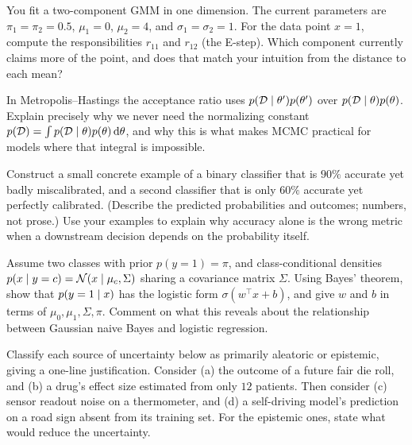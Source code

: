 \begin{exercise}
You fit a two-component GMM in one dimension. The current parameters are
$\pi_1=\pi_2=0.5$, $\mu_1=0$, $\mu_2=4$, and $\sigma_1=\sigma_2=1$. For the data
point $x=1$, compute the responsibilities $r_{11}$ and $r_{12}$ (the E-step).
Which component currently claims more of the point, and does that match your
intuition from the distance to each mean?
\end{exercise}

\begin{exercise}
In Metropolis--Hastings the acceptance ratio uses
$p(\mathcal{D}\mid\theta')p(\theta')$ over
$p(\mathcal{D}\mid\theta)p(\theta)$. Explain precisely why we never need the
normalizing constant
$p(\mathcal{D}) = \int p(\mathcal{D}\mid\theta)p(\theta)\,\mathrm{d}\theta$,
and why this is what makes MCMC practical for models where that integral is
impossible.
\end{exercise}

\begin{exercise}
Construct a small concrete example of a binary classifier that is $90\%$ accurate
yet badly miscalibrated, and a second classifier that is only $60\%$ accurate yet
perfectly calibrated. (Describe the predicted probabilities and outcomes; numbers,
not prose.) Use your examples to explain why accuracy alone is the wrong metric
when a downstream decision depends on the probability itself.
\end{exercise}

\begin{exercise}
Assume two classes with prior $p(y=1)=\pi$, and class-conditional densities
$p(x\mid y=c) = \mathcal{N}(x\mid\mu_c,\Sigma)$ sharing a covariance matrix $\Sigma$.
Using Bayes' theorem, show that $p(y=1\mid x)$ has
the logistic form $\sigma(w^\top x + b)$, and give $w$ and $b$ in terms of
$\mu_0,\mu_1,\Sigma,\pi$. Comment on what this reveals about the relationship
between Gaussian naive Bayes and logistic regression.
\end{exercise}

\begin{exercise}
Classify each source of uncertainty below as primarily aleatoric or epistemic,
giving a one-line justification. Consider (a) the outcome of a future fair die
roll, and (b) a drug's effect size estimated from only $12$ patients. Then
consider (c) sensor readout noise on a thermometer, and (d) a self-driving
model's prediction on a road sign absent from its training set. For the epistemic ones, state what would reduce the
uncertainty.
\end{exercise}
